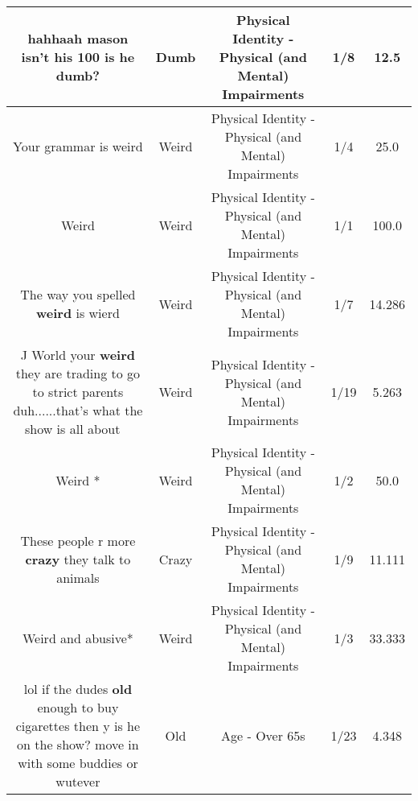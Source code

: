 \documentclass[11pt]{article}
\newlength\mylength
\begin{document}
\begin{center}
\begin{longtable}{|C{.65\mylength}|C{.30\mylength}|C{.12\mylength}|C{.12\mylength}|C{.12\mylength}|}
  \small hahhaah mason isn't his 100 is he \textbf{dumb}?\normalsize   & Dumb & Physical Identity - Physical (and Mental) Impairments & 1/8 & 12.5 \\  \hline
  \small Your grammar is weird\normalsize   & Weird & Physical Identity - Physical (and Mental) Impairments & 1/4 & 25.0 \\  \hline
  \small Weird\normalsize   & Weird & Physical Identity - Physical (and Mental) Impairments & 1/1 & 100.0 \\  \hline
  \small The way you spelled \textbf{weird} is wierd\normalsize   & Weird & Physical Identity - Physical (and Mental) Impairments & 1/7 & 14.286 \\  \hline
  \small J World your \textbf{weird} they are trading to go to strict parents duh......that's what the show is all about🤦🏾‍♀️\normalsize   & Weird & Physical Identity - Physical (and Mental) Impairments & 1/19 & 5.263 \\  \hline
  \small Weird *\normalsize   & Weird & Physical Identity - Physical (and Mental) Impairments & 1/2 & 50.0 \\  \hline
  \small These people r more \textbf{crazy} they talk to animals\normalsize   & Crazy & Physical Identity - Physical (and Mental) Impairments & 1/9 & 11.111 \\  \hline
  \small Weird and abusive*\normalsize   & Weird & Physical Identity - Physical (and Mental) Impairments & 1/3 & 33.333 \\  \hline
  \small lol if the dudes \textbf{old} enough to buy cigarettes then y is he on the show? move in with some buddies or wutever\normalsize   & Old & Age - Over 65s & 1/23 & 4.348 \\  \hline

\end{longtable}
\end{center}
\end{document}
